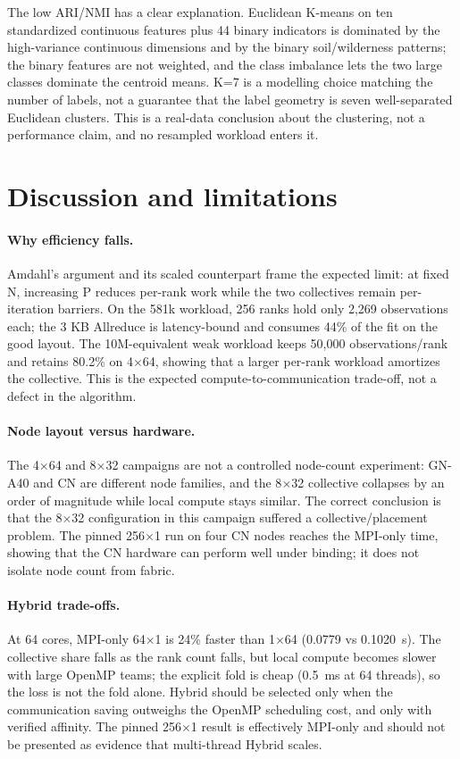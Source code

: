 \documentclass[10pt,a4paper]{article}
\begin{document}
The low ARI/NMI has a clear explanation. Euclidean K-means on ten standardized
continuous features plus 44 binary indicators is dominated by the high-variance
continuous dimensions and by the binary soil/wilderness patterns; the binary
features are not weighted, and the class imbalance lets the two large classes
dominate the centroid means. K=7 is a modelling choice matching the number of
labels, not a guarantee that the label geometry is seven well-separated
Euclidean clusters. This is a real-data conclusion about the clustering, not a
performance claim, and no resampled workload enters it.

\section{Discussion and limitations}
\paragraph{Why efficiency falls.}
Amdahl's argument \citep{amdahl1967} and its scaled counterpart \citep{gustafson1988} frame the expected limit: at fixed N, increasing P reduces per-rank work while the two collectives remain
per-iteration barriers. On the 581k workload, 256 ranks hold only 2,269
observations each; the 3 KB Allreduce is latency-bound and consumes 44\% of
the fit on the good layout. The 10M-equivalent weak workload keeps 50,000
observations/rank and retains 80.2\% on 4$\times$64, showing that a larger
per-rank workload amortizes the collective. This is the expected
compute-to-communication trade-off, not a defect in the algorithm.

\paragraph{Node layout versus hardware.}
The 4$\times$64 and 8$\times$32 campaigns are not a controlled node-count
experiment: GN-A40 and CN are different node families, and the 8$\times$32
collective collapses by an order of magnitude while local compute stays
similar. The correct conclusion is that the 8$\times$32 configuration in this
campaign suffered a collective/placement problem. The pinned 256$\times$1 run
on four CN nodes reaches the MPI-only time, showing that the CN hardware can
perform well under binding; it does not isolate node count from fabric.

\paragraph{Hybrid trade-offs.}
At 64 cores, MPI-only 64$\times$1 is 24\% faster than 1$\times$64 (0.0779 vs
0.1020~s). The collective share falls as the rank count falls, but local
compute becomes slower with large OpenMP teams; the explicit fold is cheap
(0.5~ms at 64 threads), so the loss is not the fold alone. Hybrid should be
selected only when the communication saving outweighs the OpenMP scheduling
cost, and only with verified affinity. The pinned 256$\times$1 result is
effectively MPI-only and should not be presented as evidence that multi-thread
Hybrid scales.
\end{document}
